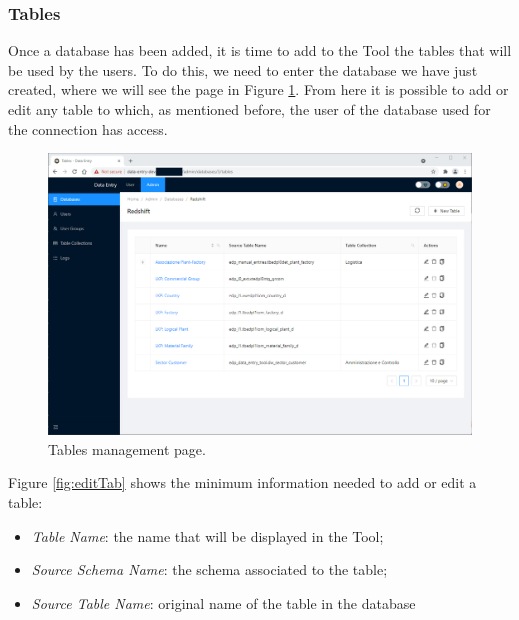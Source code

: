 \subsubsection{Tables}
Once a database has been added, it is time to add to the Tool the tables that will be used by the users. To do this, we need to enter the database we have just created, where we will see the page in Figure \ref{fig:tables}. From here it is possible to add or edit any table to which, as mentioned before, the user of the database used for the connection has access.
\begin{figure}[!htb]
    \centering
    \includegraphics[width=15.8cm]{chapters/images/ch_3/FE/Admin/tables.png}
    \caption{Tables management page.}
    \label{fig:tables}
\end{figure}

Figure \ref{fig:editTab} shows the minimum information needed to add or edit a table:
\begin{itemize}
    \item \emph{Table Name}: the name that will be displayed in the Tool;
    \item \emph{Source Schema Name}: the schema associated to the table;
    \item \emph{Source Table Name}: original name of the table in the database
\end{itemize}


